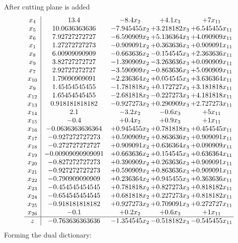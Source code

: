 \documentclass[11pt]{article}
\begin{document}
 After cutting plane is added 
\[\begin{array}{c| c c@{\hskip 2pt} c@{\hskip 2pt} c@{\hskip 2pt} }
 x_{4}   &  13.4 & -8.4 x_{2} & + 4.1 x_{3} & + 7 x_{11}\\
 x_{5}   &  10.0636363636 & -7.945455 x_{2} & + 3.218182 x_{3} & + 6.545455 x_{11}\\
 x_{6}   &  7.92727272727 & -6.590909 x_{2} & + 5.136364 x_{3} & + 4.090909 x_{11}\\
 x_{1}   &  1.27272727273 & -0.909091 x_{2} & + 0.363636 x_{3} & + 0.909091 x_{11}\\
 x_{8}   &  6.00909090909 & -0.663636 x_{2} & -0.154545 x_{3} & + 2.363636 x_{11}\\
 x_{9}   &  3.82727272727 & -1.390909 x_{2} & -3.263636 x_{3} & + 0.090909 x_{11}\\
 x_{7}   &  2.92727272727 & -3.590909 x_{2} & -0.863636 x_{3} & + 5.090909 x_{11}\\
 x_{10}   &  1.79090909091 & -2.236364 x_{2} & + 0.054545 x_{3} & + 3.636364 x_{11}\\
 x_{9}   &  1.45454545455 & -1.781818 x_{2} & + 0.172727 x_{3} & + 3.181818 x_{11}\\
 x_{12}   &  1.65454545455 & -2.681818 x_{2} & -0.227273 x_{3} & + 4.181818 x_{11}\\
 x_{13}   &  0.918181818182 & -0.927273 x_{2} & + 0.290909 x_{3} & + 2.727273 x_{11}\\
 x_{14}   &  2.1 & -3.2 x_{2} & -0.6 x_{3} & + 5 x_{11}\\
 x_{15}   &  -0.4 & + 0.4 x_{2} & + 0.9 x_{3} & + 1 x_{11}\\
 x_{16}   &  -0.0636363636364 & + 0.945455 x_{2} & + 0.781818 x_{3} & + 0.454545 x_{11}\\
 x_{17}   &  -0.927272727273 & + 0.590909 x_{2} & + 0.863636 x_{3} & + 0.909091 x_{11}\\
 x_{18}   &  -0.272727272727 & + 0.909091 x_{2} & + 0.636364 x_{3} & + 0.090909 x_{11}\\
 x_{19}   &  -0.00909090909091 & + 0.663636 x_{2} & + 0.154545 x_{3} & + 0.636364 x_{11}\\
 x_{20}   &  -0.827272727273 & + 0.390909 x_{2} & + 0.263636 x_{3} & + 0.909091 x_{11}\\
 x_{21}   &  -0.927272727273 & + 0.590909 x_{2} & + 0.863636 x_{3} & + 0.909091 x_{11}\\
 x_{22}   &  -0.790909090909 & + 0.236364 x_{2} & + 0.945455 x_{3} & + 0.363636 x_{11}\\
 x_{23}   &  -0.454545454545 & + 0.781818 x_{2} & + 0.827273 x_{3} & + 0.818182 x_{11}\\
 x_{24}   &  -0.654545454545 & + 0.681818 x_{2} & + 0.227273 x_{3} & + 0.818182 x_{11}\\
 x_{25}   &  -0.918181818182 & + 0.927273 x_{2} & + 0.709091 x_{3} & + 0.272727 x_{11}\\
 x_{26}   &  -0.1 & + 0.2 x_{2} & + 0.6 x_{3} & + 1 x_{11}\\
\hline
z    &  -0.763636363636 & -1.354545 x_{2} & -0.518182 x_{3} & -0.545455 x_{11}\\
\end{array}\]
Forming the dual dictionary:
\end{document}
